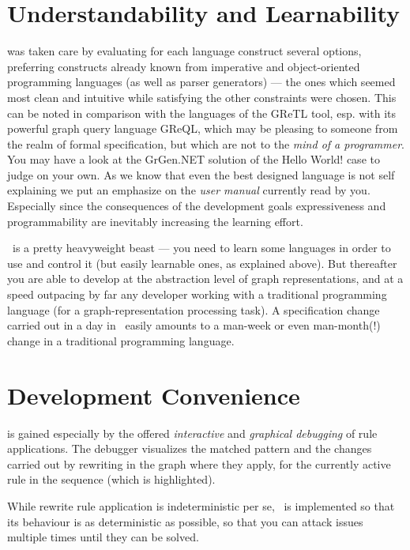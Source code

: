 \section{Understandability and Learnability}
was taken care by evaluating for each language construct several options,
preferring constructs already known from imperative and object-oriented programming languages (as well as parser generators) ---
the ones which seemed most clean and intuitive while satisfying the other constraints were chosen.
This can be noted in comparison with the languages of the GReTL \cite{GReTL} tool, esp. with its powerful graph query language GReQL,
which may be pleasing to someone from the realm of formal specification, but which are not to the \emph{mind of a programmer}.
You may have a look at the GrGen.NET solution of the Hello World! case \cite{HelloWorld} to judge on your own.
As we know that even the best designed language is not self explaining we put an emphasize on the \emph{user manual} currently read by you.
Especially since the consequences of the development goals expressiveness and programmability are inevitably increasing the learning effort.

\GrG\ is a pretty heavyweight beast --- you need to learn some languages in order to use and control it (but easily learnable ones, as explained above).
But thereafter you are able to develop at the abstraction level of graph representations, and at a speed outpacing by far any developer working with a traditional programming language (for a graph-representation processing task).
A specification change carried out in a day in \GrG\ easily amounts to a man-week or even man-month(!) change in a traditional programming language.

\section{Development Convenience}
is gained especially by the offered \emph{interactive} and \emph{graphical debugging} of rule applications.
The debugger visualizes the matched pattern and the changes carried out by rewriting in the graph where they apply,
for the currently active rule in the sequence (which is highlighted).

While rewrite rule application is indeterministic per se, \GrG\ is implemented so that its behaviour is as deterministic as possible, so that you can attack issues multiple times until they can be solved.


